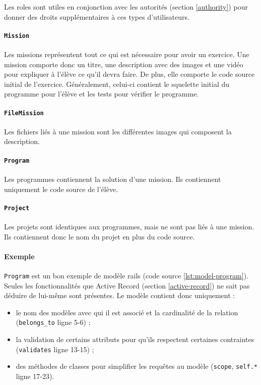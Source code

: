 Les \glspl{role} sont utiles en conjonction avec les autorités (section \ref{authority}) pour donner des droits supplémentaires à ces types d'utilisateurs.

\paragraph{\texttt{Mission}} Les \glspl{mission} représentent tout ce qui est nécessaire pour avoir un exercice. Une \gls{mission} comporte donc un titre, une description avec des images et une vidéo pour expliquer à l'élève ce qu'il devra faire. De plus, elle comporte le code source initial de l'exercice. Généralement, celui-ci contient le squelette initial du programme pour l'élève et les tests pour vérifier le programme.

\paragraph{\texttt{FileMission}} Les fichiers liés à une \gls{mission} sont les différentes images qui composent la description.

\paragraph{\texttt{Program}} Les programmes contiennent la solution d'une \gls{mission}. Ils contiennent uniquement le code source de l'élève.

\paragraph{\texttt{Project}} Les projets sont identiques aux programmes, mais ne sont pas liés à une \gls{mission}. Ils contiennent donc le nom du projet en plus du code source.

\paragraph{Exemple} \texttt{Program} est un bon exemple de modèle \gls{rails} (code source \ref{lst:model-program}). Seules les fonctionnalités que Active Record (section \ref{active-record}) ne sait pas déduire de lui-même sont présentes. Le modèle contient donc uniquement :
\begin{itemize}
  \item le nom des modèles avec qui il est associé et la cardinalité de la relation (\lstinline[language=Rails]{belongs_to} ligne 5-6) ;
  \item la validation de certains attributs pour qu'ils respectent certaines contraintes (\lstinline[language=Rails]{validates} ligne 13-15) ;
  \item des méthodes de classes pour simplifier les requêtes au modèle (\lstinline[language=Rails]{scope},  \lstinline[language=Rails]{self.*} ligne 17-23).
\end{itemize}

